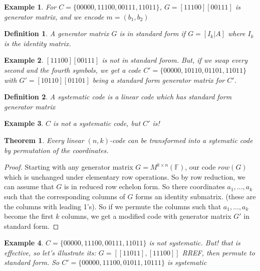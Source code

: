 \documentclass{article}
\newtheorem{thm}{Theorem}
\newtheorem{defn}{Definition}
\newtheorem{eg}{Example}
\begin{document}
\begin{eg}
    For $C = \{00000, 11100, 00111, 11011\}$,
    $G = [1 1 1 0 0] [0 0 1 1 1]$ is generator matrix, and we
    encode $m = (b_1, b_2)$
\end{eg}

\begin{defn}
    A generator matrix $G$ is in standard form if
    $G = [I_k | A]$ where $I_k$ is the identity matrix.
\end{defn}

\begin{eg}
    $[1 1 1 0 0][0 0 1 1 1]$ is not in standard forom. But, if
    we swap every second and the fourth symbols, we get a code
    $C' = \{00000, 10110, 01101, 11011\}$ with $G' = [1 0 1 1 0][0 1 1 0 1]$ being a
     standard form generator matrix for $C'$.
\end{eg}

\begin{defn}
    A systematic code is a linear code which has standard form generator matrix
\end{defn}

\begin{eg}
    $C$ is not a systematic code, but $C'$ is!
\end{eg}

\begin{thm}
    Every linear $(n, k)$-code can be transformed into a sytematic code by
    permutation of the coordinates.
\end{thm}

\begin{proof}
    Starting with any generator matrix $G = M^{k\times n}(\mathbb{F})$, our
    code $row(G)$ which is unchanged under elementary row operations.
    So by row reduction, we can assume that $G$ is in reduced row echelon
    form. So there coordinates $a_1, ..., a_k$ such that the corresponding
    columns of $G$ forms an identity submatrix. (these are the columns with
    leading 1's). So if we permute the columns such that $a_1, ..., a_k$
    become the first $k$ columns, we get a modified code with generator matrix
    $G'$ in standard form.
\end{proof}

\begin{eg}
    $C = \{00000, 11100, 00111, 11011\}$ is not systematic. But! that is
    effective, so let's illustrate its:
    $G = [[1 1 0 1 1], [1 1 1 0 0]]$ RREF, then permute to standard form.
    So $C' = \{00000, 11100, 01011, 10111\}$ is systematic
\end{eg}
\end{document}
